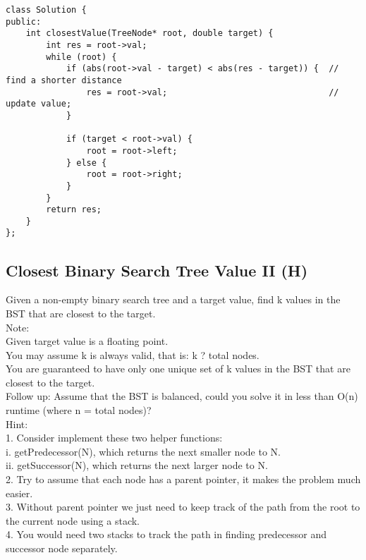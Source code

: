 \begin{lstlisting}
class Solution {
public:
    int closestValue(TreeNode* root, double target) {
        int res = root->val;
        while (root) {
            if (abs(root->val - target) < abs(res - target)) {  // find a shorter distance
                res = root->val;                                // update value;
            }
            
            if (target < root->val) {
                root = root->left;
            } else {
                root = root->right;
            }
        }
        return res;
    }
};
\end{lstlisting}


\subsection{Closest Binary Search Tree Value II (H)}
Given a non-empty binary search tree and a target value, find k values in the BST that are closest to the target.\\

Note:\\
    Given target value is a floating point.\\
    You may assume k is always valid, that is: k ? total nodes.\\
    You are guaranteed to have only one unique set of k values in the BST that are closest to the target.\\

Follow up:
Assume that the BST is balanced, could you solve it in less than O(n) runtime (where n = total nodes)?\\

Hint:\\
1. Consider implement these two helper functions:\\
i. getPredecessor(N), which returns the next smaller node to N.\\
ii. getSuccessor(N), which returns the next larger node to N.\\
2. Try to assume that each node has a parent pointer, it makes the problem much easier.\\
3. Without parent pointer we just need to keep track of the path from the root to the current node using a stack.\\
4. You would need two stacks to track the path in finding predecessor and successor node separately.\\

